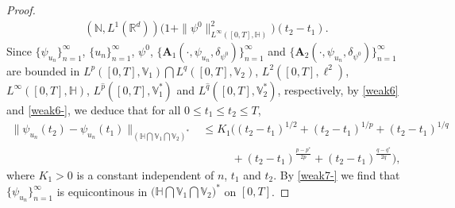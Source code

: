 \documentclass[11pt]{article}
\renewcommand{\leq}{\leqslant}
\numberwithin{equation}{section}
\begin{document}
\begin{proof}
\begin{align}
{ (\mathbb{N},L^1(\mathbb{R}^d))}
 \Big(1+
 \|\psi^0\|_{L^\infty([0,T],\mathbb{H} )}^2\Big)(t_2-t_1).
\end{align}
Since
$\{\psi_{u_n}\}_{n=1}^\infty$,
$\{u_n\}_{n=1}^\infty$, $\psi^0$,
$\{\mathbf{A}_1(\cdot,\psi_{u_n},
\delta_{\psi^0})\}_{n=1}^\infty$ and  $\{\mathbf{A}_2(\cdot,\psi_{u_n},
\delta_{\psi^0})\}_{n=1}^\infty$ are
bounded in $L^p([0,T], \mathbb{V}_1  ) \bigcap L^q([0,T],
\mathbb{V}_2)$, $L^2([0,T],\ell^2 )$, $L^\infty([0,T],\mathbb{H} )$, $L^{\widehat{p}}([0,T], \mathbb{V}^*_1)$ and $L^{\widehat{q}}([0,T], \mathbb{V}^*_2)$, respectively, by \eqref{weak6} and \eqref{weak6-}, we deduce that for all $0\leq t_1\leq t_2\leq T$,
\begin{align} \label{weak7-}
\|\psi_{u_n}(t_2)-\psi_{u_n}(t_1)
\|_{(\mathbb{H}\bigcap\mathbb{V}_1
\bigcap\mathbb{V}_2)^*}&\leq
 K_1\Big( (t_2-t_1)^{1/2}
+(t_2-t_1)^{1/p} +(t_2-t_1)^{1/q}
\nonumber\\ &\ \ \ \   \ \ \ \   \ \ \ \   +(t_2-t_1)^{\frac{p-p^*}{2p}}
+(t_2-t_1)^{\frac{q-q^*}{2q}}     \Big),
\end{align}
where $K_1>0$ is a constant independent of $n$,
$t_1$ and $t_2$. By \eqref{weak7-} we find that  $\{\psi_{u_n}\}_{n=1}^\infty$ is equicontinous  in $\big(\mathbb{H}\bigcap\mathbb{V}_1
\bigcap\mathbb{V}_2\big)^*$ on $[0,T]$.






\end{proof}
\end{document}
